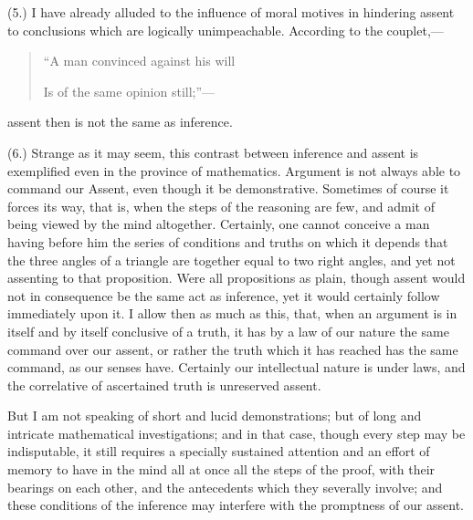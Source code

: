 (5.) I have already alluded to the influence of moral motives in
hindering assent to conclusions which are logically unimpeachable.
According to the couplet,—

\begin{quote}

``A man convinced against his will

Is of the same opinion still;''—

\end{quote}

assent then is not the same as inference.

(6.) Strange as it may seem, this contrast between inference and
assent is exemplified even in the province of mathematics. Argument is
not always able to command our Assent, even though it be
demonstrative. Sometimes of course it forces its way, that is, when
the steps of the reasoning are few, and admit of being viewed by the
mind altogether. Certainly, one cannot conceive a man having before
him the series of conditions and truths on which it depends that the
three angles of a triangle are together equal to two right angles, and
yet not assenting to that proposition. Were all propositions as plain,
though assent would not in consequence be the same act as inference,
yet it would certainly follow immediately upon it. I allow then as
much as this, that, when an argument is in itself and by itself
conclusive of a truth, it has by a law of our nature the same command
over our assent, or rather the truth which it has reached has the same
command, as our senses have. Certainly our intellectual nature is
under laws, and the correlative of ascertained truth is unreserved
assent.

But I am not speaking of short and lucid demonstrations; but of
long and intricate mathematical investigations; and in that case,
though every step may be indisputable, it still requires a specially
sustained attention and an effort of memory to have in the mind all at
once all the steps of the proof, with their bearings on each other,
and the antecedents which they severally involve; and these conditions
of the inference may interfere with the promptness of our assent.

